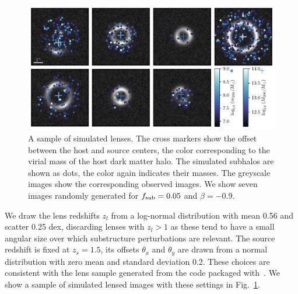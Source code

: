 \documentclass[twocolumn]{aastex62}
\begin{document}
\begin{figure}
\centering
\includegraphics[width=1.\textwidth]{figures/simulations}
\caption{A sample of simulated lenses. The cross markers show the offset between the host and source centers, the color corresponding to the virial mass of the host dark matter halo. The simulated subhalos are shown as dots, the color again indicates their masses. The greyscale images show the corresponding observed images. We show seven images randomly generated for $f_{\mathrm{sub}} = 0.05$ and $\beta = -0.9$.}
\label{fig:simulations}
\end{figure}

We draw the lens redshifts $z_l$ from a log-normal distribution with mean 0.56 and scatter 0.25 dex, discarding lenses with $z_l > 1$ as these tend to have a small angular size over which substructure perturbations are relevant. The source redshift is fixed at $z_s = 1.5$, its offsets $\theta_x$ and $\theta_y$ are drawn from a normal distribution with zero mean and standard deviation 0.2. These choices are consistent with the lens sample generated from the  code packaged with~\citet{2015ApJ...811...20C}. We show a sample of simulated lensed images with these settings in Fig.~\ref{fig:simulations}.
\end{document}

